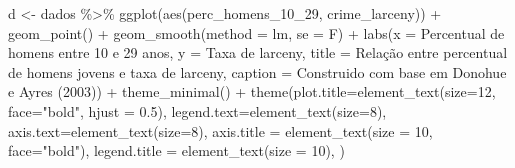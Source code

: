 \documentclass[
]{article}
\newenvironment{Shaded}{\begin{snugshade}}{\end{snugshade}}
\newcommand{\AttributeTok}[1]{\textcolor[rgb]{0.77,0.63,0.00}{#1}}
\newcommand{\DecValTok}[1]{\textcolor[rgb]{0.00,0.00,0.81}{#1}}
\newcommand{\FloatTok}[1]{\textcolor[rgb]{0.00,0.00,0.81}{#1}}
\newcommand{\FunctionTok}[1]{\textcolor[rgb]{0.00,0.00,0.00}{#1}}
\newcommand{\NormalTok}[1]{#1}
\newcommand{\OtherTok}[1]{\textcolor[rgb]{0.56,0.35,0.01}{#1}}
\newcommand{\SpecialCharTok}[1]{\textcolor[rgb]{0.00,0.00,0.00}{#1}}
\newcommand{\StringTok}[1]{\textcolor[rgb]{0.31,0.60,0.02}{#1}}
\begin{document}
\begin{Shaded}
\begin{Highlighting}[]
\NormalTok{d }\OtherTok{\textless{}{-}}\NormalTok{ dados }\SpecialCharTok{\%\textgreater{}\%} 
  \FunctionTok{ggplot}\NormalTok{(}\FunctionTok{aes}\NormalTok{(perc\_homens\_10\_29, crime\_larceny)) }\SpecialCharTok{+}
  \FunctionTok{geom\_point}\NormalTok{() }\SpecialCharTok{+} 
  \FunctionTok{geom\_smooth}\NormalTok{(}\AttributeTok{method =} \StringTok{\textquotesingle{}lm\textquotesingle{}}\NormalTok{, }\AttributeTok{se =}\NormalTok{ F) }\SpecialCharTok{+}
  \FunctionTok{labs}\NormalTok{(}\AttributeTok{x =} \StringTok{\textquotesingle{}Percentual de homens entre 10 e 29 anos\textquotesingle{}}\NormalTok{,}
       \AttributeTok{y =} \StringTok{\textquotesingle{}Taxa de larceny\textquotesingle{}}\NormalTok{,}
       \AttributeTok{title =} \StringTok{\textquotesingle{}Relação entre percentual de homens jovens e taxa de larceny\textquotesingle{}}\NormalTok{,}
       \AttributeTok{caption =} \StringTok{\textquotesingle{}Construido com base em Donohue e Ayres (2003)\textquotesingle{}}\NormalTok{) }\SpecialCharTok{+} 
  \FunctionTok{theme\_minimal}\NormalTok{() }\SpecialCharTok{+}
  \FunctionTok{theme}\NormalTok{(}\AttributeTok{plot.title=}\FunctionTok{element\_text}\NormalTok{(}\AttributeTok{size=}\DecValTok{12}\NormalTok{, }\AttributeTok{face=}\StringTok{"bold"}\NormalTok{, }\AttributeTok{hjust =} \FloatTok{0.5}\NormalTok{),}
        \AttributeTok{legend.text=}\FunctionTok{element\_text}\NormalTok{(}\AttributeTok{size=}\DecValTok{8}\NormalTok{),}
        \AttributeTok{axis.text=}\FunctionTok{element\_text}\NormalTok{(}\AttributeTok{size=}\DecValTok{8}\NormalTok{),}
        \AttributeTok{axis.title =} \FunctionTok{element\_text}\NormalTok{(}\AttributeTok{size =} \DecValTok{10}\NormalTok{, }\AttributeTok{face=}\StringTok{"bold"}\NormalTok{),}
        \AttributeTok{legend.title =} \FunctionTok{element\_text}\NormalTok{(}\AttributeTok{size =} \DecValTok{10}\NormalTok{),}
\NormalTok{        )}
  

\end{Highlighting}
\end{Shaded}
\end{document}
